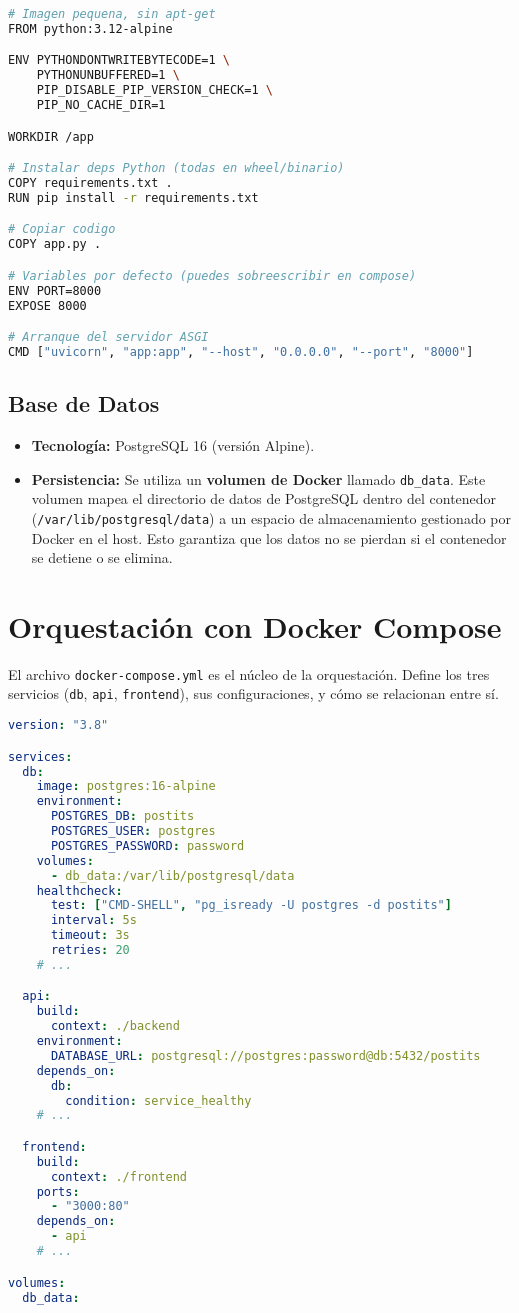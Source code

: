 \documentclass[12pt, a4paper]{article}
\begin{document}
\begin{lstlisting}[language=bash, caption={Dockerfile del Backend}]
# Imagen pequena, sin apt-get
FROM python:3.12-alpine

ENV PYTHONDONTWRITEBYTECODE=1 \
    PYTHONUNBUFFERED=1 \
    PIP_DISABLE_PIP_VERSION_CHECK=1 \
    PIP_NO_CACHE_DIR=1

WORKDIR /app

# Instalar deps Python (todas en wheel/binario)
COPY requirements.txt .
RUN pip install -r requirements.txt

# Copiar codigo
COPY app.py .

# Variables por defecto (puedes sobreescribir en compose)
ENV PORT=8000
EXPOSE 8000

# Arranque del servidor ASGI
CMD ["uvicorn", "app:app", "--host", "0.0.0.0", "--port", "8000"]
\end{lstlisting}

\subsection{Base de Datos}
\begin{itemize}
    \item \textbf{Tecnología:} PostgreSQL 16 (versión Alpine).
    \item \textbf{Persistencia:} Se utiliza un \textbf{volumen de Docker} llamado \texttt{db\_data}. Este volumen mapea el directorio de datos de PostgreSQL dentro del contenedor (\texttt{/var/lib/postgresql/data}) a un espacio de almacenamiento gestionado por Docker en el host. Esto garantiza que los datos no se pierdan si el contenedor se detiene o se elimina.
\end{itemize}


\section{Orquestación con Docker Compose}
El archivo \texttt{docker-compose.yml} es el núcleo de la orquestación. Define los tres servicios (\texttt{db}, \texttt{api}, \texttt{frontend}), sus configuraciones, y cómo se relacionan entre sí.

\begin{lstlisting}[language=yaml, caption={Fragmento de docker-compose.yml}]
version: "3.8"

services:
  db:
    image: postgres:16-alpine
    environment:
      POSTGRES_DB: postits
      POSTGRES_USER: postgres
      POSTGRES_PASSWORD: password
    volumes:
      - db_data:/var/lib/postgresql/data
    healthcheck:
      test: ["CMD-SHELL", "pg_isready -U postgres -d postits"]
      interval: 5s
      timeout: 3s
      retries: 20
    # ...

  api:
    build:
      context: ./backend
    environment:
      DATABASE_URL: postgresql://postgres:password@db:5432/postits
    depends_on:
      db:
        condition: service_healthy
    # ...

  frontend:
    build:
      context: ./frontend
    ports:
      - "3000:80"
    depends_on:
      - api
    # ...

volumes:
  db_data:
\end{lstlisting}
\end{document}
